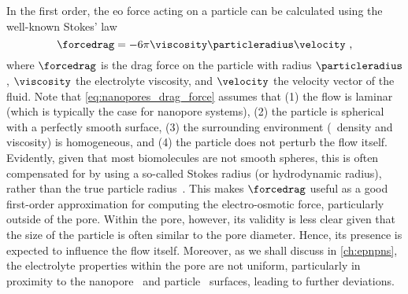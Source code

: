 In the first order, the \gls{eo} force acting on a particle can be calculated using the well-known Stokes' law
%
\begin{equation}\label{eq:nanopores_drag_force}
  \forcedrag = - 6 \pi \viscosity \particleradius \velocity
  \text{ ,}
\end{equation}
%
where $\forcedrag$ is the drag force on the particle with radius $\particleradius$, $\viscosity$ the
electrolyte viscosity, and $\velocity$ the velocity vector of the fluid. Note that
\cref{eq:nanopores_drag_force} assumes that (1) the flow is laminar (which is typically the case for nanopore
systems\footnotemark), %
%
%
%
(2) the particle is spherical with a perfectly smooth surface, (3) the surrounding environment (\ie~density
and viscosity) is homogeneous, and (4) the particle does not perturb the flow itself. Evidently, given that
most biomolecules are not smooth spheres, this is often compensated for by using a so-called Stokes radius (or
hydrodynamic radius), rather than the true particle radius~\cite{Ortega-2011}. This makes $\forcedrag$ useful as a
good first-order approximation for computing the electro-osmotic force, particularly outside of the pore.
Within the pore, however, its validity is less clear given that the size of the particle is often similar to
the pore diameter. Hence, its presence is expected to influence the flow itself. Moreover, as we shall discuss
in \cref{ch:epnpns}, the electrolyte properties within the pore are not uniform, particularly in proximity to
the nanopore~\cite{Qiao-Aluru-2003,Vo-2016,Hsu-2017,Ye-2011} and particle~\cite{Pronk-2014,Makarov-1998}
surfaces, leading to further deviations.

